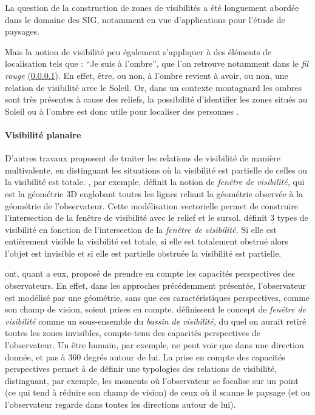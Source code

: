 La question de la construction de zones de visibilités a été
longuement abordée dans le domaine des SIG, notamment en vue
d’applications pour l'étude de paysages.

Mais la notion de visibilité peu également s'appliquer à des éléments
de localisation tels que : \enquote{Je suis à l'ombre}, que l'on
retrouve notamment dans le \emph{fil rouge} (\ref{}). En effet, être,
ou non, à l'ombre revient à avoir, ou non, une relation de visibilité
avec le Soleil. Or, dans un contexte montagnard les ombres sont très
présentes à cause des reliefs, la possibilité d'identifier les zones
situés au Soleil ou à l'ombre est donc utile pour localiser des
personnes \autocite{Houpert2003}.


\paragraph{Visibilité planaire}


D'autres travaux proposent de traiter les relations de visibilité de
manière multivalente, \ie en distinguant les situations où la
visibilité est partielle de celles ou la visibilité est
totale. \textcite{Ramos2003}, par exemple, définit la notion de
\emph{fenêtre de visibilité,} qui est la géométrie 3D englobant toutes
les lignes reliant la géométrie observée à la géométrie de
l'observateur. Cette modélisation vectorielle permet de construire
l'intersection de la fenêtre de visibilité avec le relief et le
sursol. \textcite{Ramos203} définit 3 types de visibilité en fonction
de l'intersection de la \emph{fenêtre de visibilité.} Si elle est
entièrement visible la visibilité est totale, si elle est totalement
obstrué alors l'objet est invisible et si elle est partielle obstruée
la visibilité est partielle.

\textcite{Lonergan2016} ont, quant a eux, proposé de prendre en compte
les capacités perspectives des observateurs. En effet, dans les
approches précédemment présentée, l'observateur est modélisé par une
géométrie, sans que ces caractéristiques perspectives, comme son champ
de vision, soient prises en compte. \textcite{Lonergan2016}
définissent le concept de \emph{fenêtre de visibilité} comme un
sous-ensemble du \emph{bassin de visibilité,} du quel on aurait retiré
toutes les zones invisibles, compte-tenu des capacités perspectives de
l'observateur. Un être humain, par exemple, ne peut voir que dans une
direction donnée, et pas à 360 degrés autour de lui. La prise en
compte des capacités perspectives permet à \textcite{Lonergan2016} de
définir une typologies des relations de visibilité, distinguant, par
exemple, les moments où l'observateur se focalise sur un point (ce qui
tend à réduire son champ de vision) de ceux où il scanne le paysage
(et ou l'observateur regarde dans toutes les directions autour de
lui).

